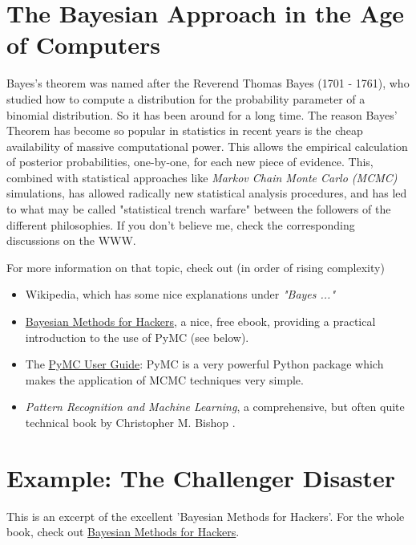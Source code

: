 \section{The Bayesian Approach in the Age of Computers}

Bayes's theorem was named after the Reverend Thomas Bayes (1701 - 1761), who studied how to compute a distribution for the probability parameter of a binomial distribution. So it has been around for a long time. The reason Bayes' Theorem has become so popular in statistics in recent years is the cheap availability of massive computational power. This allows the empirical calculation of posterior probabilities, one-by-one, for each new piece of evidence. This, combined with statistical approaches like \emph{Markov Chain Monte Carlo (MCMC)} simulations, has allowed radically new statistical analysis procedures, and has led to what may be called "statistical trench warfare" between the followers of the different philosophies. If you don't believe me, check the corresponding discussions on the WWW.

For more information on that topic, check out (in order of rising complexity)

\begin{itemize}
  \item Wikipedia, which has some nice explanations under \emph{"Bayes ..."}
  \item \href{http://camdavidsonpilon.github.io/Probabilistic-Programming-and-Bayesian-Methods-for-Hackers/}{Bayesian Methods for Hackers}, a nice, free ebook, providing a practical introduction to the use of PyMC (see below).
  \item The \href{http://pymc-devs.github.io/pymc/}{PyMC User Guide}: PyMC is a very powerful Python package which makes the application of MCMC techniques very simple.
  \item \emph{Pattern Recognition and Machine Learning}, a comprehensive, but often quite technical book by Christopher M. Bishop \cite{Bishop2007}.
\end{itemize}

\section{Example: The Challenger Disaster}

This is an excerpt of the excellent 'Bayesian Methods for Hackers'. For the whole book, check out \href{http://camdavidsonpilon.github.io/Probabilistic-Programming-and-Bayesian-Methods-for-Hackers/}{Bayesian Methods for Hackers}.

